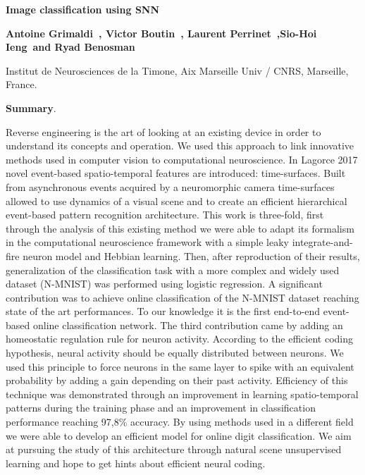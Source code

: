 \documentclass[12pt]{article}
\newcommand{\AuthorAG}{Antoine Grimaldi}
\newcommand{\AuthorLP}{Laurent Perrinet}
\newcommand{\AuthorVB}{Victor Boutin}
\newcommand{\AuthorSI}{Sio-Hoi Ieng}
\newcommand{\AuthorRB}{Ryad Benosman}%
\begin{document}
{\Large\bf
Image classification using SNN
}

{\bf
\AuthorAG\ , \AuthorVB\ , \AuthorLP\ ,\AuthorSI\ and \AuthorRB}

{
Institut de Neurosciences de la Timone, Aix Marseille Univ / CNRS, Marseille, France.
}


\parindent 12pt

\textbf{Summary}.

Reverse engineering is the art of looking at an existing device in order to understand its concepts and operation. We used this approach to link innovative methods used in computer vision to computational neuroscience. In Lagorce 2017 novel event-based spatio-temporal features are introduced: time-surfaces. Built from asynchronous events acquired by a neuromorphic camera time-surfaces allowed to use dynamics of a visual scene and to create an efficient hierarchical event-based pattern recognition architecture. This work is three-fold, first through the analysis of this existing method we were able to adapt its formalism in the computational neuroscience framework with a simple leaky integrate-and-fire neuron model and Hebbian learning. Then, after reproduction of their results, generalization of the classification task with a more complex and widely used dataset (N-MNIST) was performed using logistic regression. A significant contribution was to achieve online classification of the N-MNIST dataset reaching state of the art performances. To our knowledge it is the first end-to-end event-based online classification network. The third contribution came by adding an homeostatic regulation rule for neuron activity. According to the efficient coding hypothesis, neural activity should be equally distributed between neurons. We used this principle to force neurons in the same layer to spike with an equivalent probability by adding a gain depending on their past activity. Efficiency of this technique was demonstrated through an improvement in learning spatio-temporal patterns during the training phase and an improvement in classification performance reaching 97,8\% accuracy. By using methods used in a different field we were able to develop an efficient model for online digit classification. We aim at pursuing the study of this architecture through natural scene unsupervised learning and hope to get hints about efficient neural coding.
\end{document}
